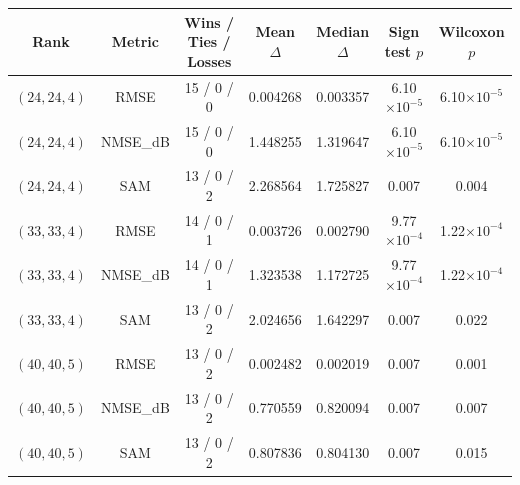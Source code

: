 \begin{tabular}{c|c|c|c|c|c|c}
\toprule
Rank & Metric & Wins / Ties / Losses & Mean $\Delta$ & Median $\Delta$ & Sign test $p$ & Wilcoxon $p$ \\
\midrule
$(24, 24, 4)$ & RMSE & 15 / 0 / 0 & 0.004268 & 0.003357 & 6.10$\times 10^{-5}$ & 6.10$\times 10^{-5}$ \\
$(24, 24, 4)$ & NMSE_dB & 15 / 0 / 0 & 1.448255 & 1.319647 & 6.10$\times 10^{-5}$ & 6.10$\times 10^{-5}$ \\
$(24, 24, 4)$ & SAM & 13 / 0 / 2 & 2.268564 & 1.725827 & 0.007 & 0.004 \\
$(33, 33, 4)$ & RMSE & 14 / 0 / 1 & 0.003726 & 0.002790 & 9.77$\times 10^{-4}$ & 1.22$\times 10^{-4}$ \\
$(33, 33, 4)$ & NMSE_dB & 14 / 0 / 1 & 1.323538 & 1.172725 & 9.77$\times 10^{-4}$ & 1.22$\times 10^{-4}$ \\
$(33, 33, 4)$ & SAM & 13 / 0 / 2 & 2.024656 & 1.642297 & 0.007 & 0.022 \\
$(40, 40, 5)$ & RMSE & 13 / 0 / 2 & 0.002482 & 0.002019 & 0.007 & 0.001 \\
$(40, 40, 5)$ & NMSE_dB & 13 / 0 / 2 & 0.770559 & 0.820094 & 0.007 & 0.007 \\
$(40, 40, 5)$ & SAM & 13 / 0 / 2 & 0.807836 & 0.804130 & 0.007 & 0.015 \\
\bottomrule
\end{tabular}
